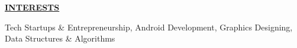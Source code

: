 \documentclass[a4paper]{deedy-resume} %
\begin{document}



{\uppercase\uline{\textbf{\large{INTERESTS}}\hfill}}

\microspace
Tech Startups \& Entrepreneurship, Android Development, Graphics Designing, Data Structures \& Algorithms
\minispace
\end{document}
